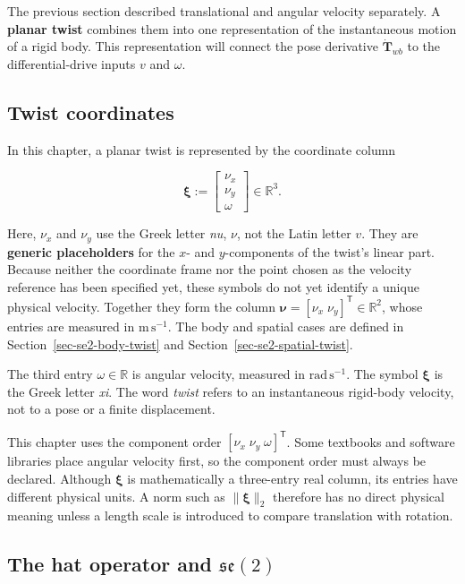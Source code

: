 \documentclass[
  australian,
  12pt,
  letterpaper,
  DIV=11,
  numbers=noendperiod,
  twoside]{scrreprt}
\begin{document}
The previous section described translational and angular velocity
separately. A \textbf{planar twist} combines them into one
representation of the instantaneous motion of a rigid body. This
representation will connect the pose derivative \(\dot{\mathbf T}_{wb}\)
to the differential-drive inputs \(v\) and \(\omega\).

\subsection{Twist coordinates}\label{twist-coordinates}

In this chapter, a planar twist is represented by the coordinate column

\[
\boxed{
\boldsymbol\xi
\mathrel{:=}
\begin{bmatrix}
\nu_x\\
\nu_y\\
\omega
\end{bmatrix}
\in\mathbb R^3
}.
\]

Here, \(\nu_x\) and \(\nu_y\) use the Greek letter \emph{nu}, \(\nu\),
not the Latin letter \(v\). They are \textbf{generic placeholders} for
the \(x\)- and \(y\)-components of the twist's linear part. Because
neither the coordinate frame nor the point chosen as the velocity
reference has been specified yet, these symbols do not yet identify a
unique physical velocity. Together they form the column
\(\boldsymbol\nu=[\nu_x\;\nu_y]^\mathsf T\in\mathbb R^2\), whose entries
are measured in \(\mathrm{m\,s^{-1}}\). The body and spatial cases are
defined in Section~\ref{sec-se2-body-twist} and
Section~\ref{sec-se2-spatial-twist}.

The third entry \(\omega\in\mathbb R\) is angular velocity, measured in
\(\mathrm{rad\,s^{-1}}\). The symbol \(\boldsymbol\xi\) is the Greek
letter \emph{xi}. The word \emph{twist} refers to an instantaneous
rigid-body velocity, not to a pose or a finite displacement.

This chapter uses the component order
\([\nu_x\;\nu_y\;\omega]^\mathsf T\). Some textbooks and software
libraries place angular velocity first, so the component order must
always be declared. Although \(\boldsymbol\xi\) is mathematically a
three-entry real column, its entries have different physical units. A
norm such as \(\lVert\boldsymbol\xi\rVert_2\) therefore has no direct
physical meaning unless a length scale is introduced to compare
translation with rotation.

\subsection{\texorpdfstring{The hat operator and
\(\mathfrak{se}(2)\)}{The hat operator and \textbackslash mathfrak\{se\}(2)}}\label{sec-se2-hat-operator}
\end{document}
